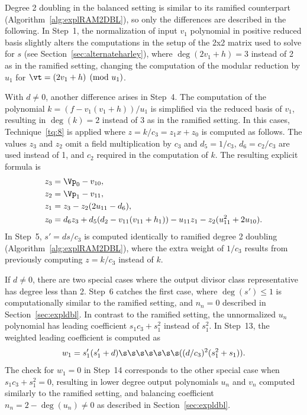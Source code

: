 Degree 2 doubling in the balanced setting is similar to its ramified counterpart
(Algorithm~\ref{alg:explRAM2DBL}), so only the differences are described in the
following. In Step~1, the normalization of input $v_1$ polynomial in positive
reduced basis slightly alters the computations in the setup of the 2x2 matrix
used to solve for $s$ (see Section~\ref{sec:alternateharley}), where $\deg(2v_1
+ h) = 3$ instead of 2 as in the ramified setting, changing the computation of
the modular reduction by $u_1$ for $\vt = (2v_1 + h) \pmod{u_1}$. 

With $d \neq 0$, another difference arises in Step~4. The computation of the
polynomial $k = (f - v_1(v_1 + h))/u_1$ is simplified via the reduced basis of
$v_1$, resulting in $\deg(k) =2$ instead of $3$ as in the ramified setting.
In this cases, Technique~\ref{tq:8} is applied where $z = k/c_3 = z_1x + z_0$ is computed
as follows. The values $z_3$ and $z_2$ omit a field multiplication by $c_3$ and
$d_5 = 1/c_3$, $d_6 = c_2/c_3$ are used instead of 1, and $c_2$  required in the
computation of $k$. The resulting explicit formula is
\begin{align*}
    z_3  &= \Vp_0 - v_{10},\\
    z_2  &= \Vp_1 - v_{11},\\
    z_1  &= z_3 - z_2(2u_{11} - d_6),\\
    z_0  &= d_6z_3 + d_5(d_2 - v_{11}(v_{11} + h_1)) - u_{11}z_1 - z_2(u_{11}^2 + 2u_{10}).
\end{align*} 
In Step~5, $s' = ds/c_3$ is computed identically to ramified degree 2 doubling
(Algorithm~\ref{alg:explRAM2DBL}), where the extra weight of $1/c_3$ results from
previously computing $z = k/c_3$ instead of $k$.

If $d \neq 0$, there are two special cases where the output divisor class
representative has degree less than 2. Step~6 catches the first case, where
$\deg(s') \leq 1$ is computationally similar to the ramified setting, and $n_n =
0$ described in Section~\ref{sec:expldbl}. In contrast to the ramified setting,
the unnormalized $u_n$ polynomial has leading coefficient $s_1c_3 + s_1^2$
instead of $s_1^2$. In Step~13, the weighted leading coefficient is computed as
$$ w_1 = s_1'(s_1' + d) \s\s\s\s\s\s\s ((d/c_3)^2(s_1^2 + s_1)). $$ The check
for $w_1 = 0$ in Step~14 corresponds to the other special case when $s_1c_3 +
s_1^2 = 0$, resulting in lower degree output polynomials $u_n$ and $v_n$
computed similarly to the ramified setting, and balancing coefficient $n_n = 2 -
\deg(u_n) \neq 0$ as described in Section~\ref{sec:expldbl}.

